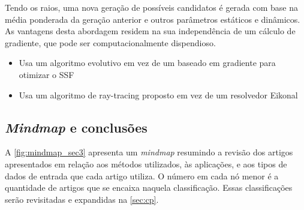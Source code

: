 Tendo os raios, uma nova geração de possíveis candidatos é gerada com base na média ponderada da geração anterior e outros parâmetros estáticos e dinâmicos. As vantagens desta abordagem residem na sua independência de um cálculo de gradiente, que pode ser computacionalmente dispendioso.

\begin{itemize}
	\item Usa um algoritmo evolutivo em vez de um baseado em gradiente para otimizar o SSF
	\item Usa um algoritmo de ray-tracing proposto em vez de um resolvedor Eikonal
\end{itemize}

%
%

\subsection{\textsl{Mindmap} e conclusões}

A \cref{fig:mindmap_sec3} apresenta um \textsl{mindmap} resumindo a revisão dos artigos apresentados em relação aos métodos utilizados, às aplicações, e aos tipos de dados de entrada que cada artigo utiliza. O número em cada nó menor é a quantidade de artigos que se encaixa naquela classificação. Essas classificações serão revisitadas e expandidas na \cref{sec:cp}.


